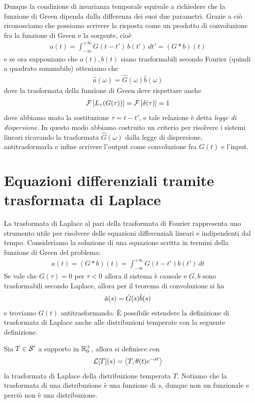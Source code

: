 Dunque la condizione di invarianza temporale equivale a richiedere che la funzione di Green dipenda dalla differenza dei suoi due 
parametri. Grazie a ciò riconosciamo che possiamo scrivere la risposta come un prodotto di convoluzione fra la funzione di Green e la sorgente, cioè
\begin{align}
  a(t) = \int_{-\infty}^{+\infty} G(t - t')\, b(t')\,dt' = (G*b)(t)
\end{align}
e se ora supponiamo che $ a(t), b(t) $ siano trasformabili secondo Fourier (quindi a quadrato sommabile) otteniamo che 
\begin{align}
  \hat{a}(\omega) = \hat{G}(\omega) \hat{b}(\omega)
\end{align}
dove la trasformata della funzione di Green deve rispettare anche
\begin{align}
  \F\left[ L_\tau(G(\tau)) \right] = \F\left[ \delta(\tau) \right] = 1
\end{align}
dove abbiamo usato la sostituzione $ \tau = t - t' $, e tale relazione è detta \textit{legge di dispersione}. In questo modo abbiamo costruito un 
criterio per risolvere i sistemi lineari ricavando la trasformata $ \hat{G}(\omega) $ dalla legge di dispersione, antitrasformarla e infine scrivere 
l'output come convoluzione fra $ G(t) $ e l'input.


\section{Equazioni differenziali tramite trasformata di Laplace}
La trasformata di Laplace al pari della trasformata di Fourier rappresenta uno strumento utile per risolvere delle equazioni differenziali lineari e 
indipendenti dal tempo. Consideriamo la soluzione di una equazione scritta in termini della funzione di Green del problema:
\begin{align}
  a(t) = (G*b)(t) = \int_{-\infty}^{+\infty} G(t - t') b(t') \, dt
\end{align}
Se vale che $ G(\tau) = 0 $ per $ \tau < 0 $ allora il sistema è causale e $ G, b $ sono trasformabili secondo Laplace, allora 
per il teorema di convoluzione si ha
\begin{align}
  \ti{a}(s) = \ti{G}(s) \ti{b}(s)
\end{align}
e troviamo $ G(t) $ antitrasformando.
È possibile estendere la definizione di trasformata di Laplace anche alle distribuzioni temperate con la seguente definizione. 
\begin{definition}[  ]
  Sia $ T \in \S' $ a supporto in $ \R^+_0 $, allora si definisce con 
  \begin{align}
    \L[T](s) = \sca{T, \theta(t) e^{-st}}
  \end{align}
  la trasformata di Laplace della distribuzione temperata $ T $. Notiamo che la trasformata di una distribuzione è una funzione di $ s $, dunque non un 
  funzionale e perciò non è una distribuzione.
\end{definition}

